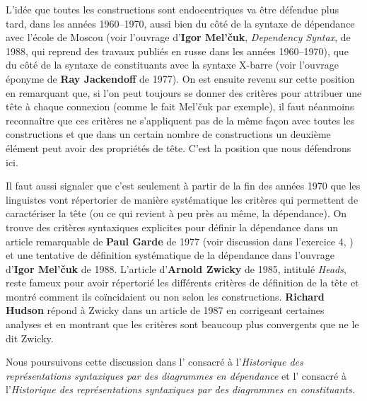 {    L’idée que toutes les constructions sont endocentriques va être défendue plus tard, dans les années 1960--1970, aussi bien du côté de la syntaxe de dépendance avec l’école de Moscou (voir l’ouvrage d’\textbf{Igor Mel’čuk}, \textit{Dependency Syntax}, de 1988, qui reprend des travaux publiés en russe dans les années 1960--1970), que du côté de la syntaxe de constituants avec la syntaxe X-barre (voir l’ouvrage éponyme de \textbf{Ray Jackendoff} de 1977). On est ensuite revenu sur cette position en remarquant que, si l’on peut toujours se donner des critères pour attribuer une tête à chaque connexion (comme le fait Mel’čuk par exemple), il faut néanmoins reconnaître que ces critères ne s’appliquent pas de la même façon avec toutes les constructions et que dans un certain nombre de constructions un deuxième élément peut avoir des propriétés de tête. C’est la position que nous défendrons ici.

    Il faut aussi signaler que c’est seulement à partir de la fin des années 1970 que les linguistes vont répertorier de manière systématique les critères qui permettent de caractériser la tête (ou ce qui revient à peu près au même, la dépendance). On trouve des critères syntaxiques explicites pour définir la dépendance dans un article remarquable de \textbf{Paul Garde} de 1977 (voir discussion dans l’exercice 4, ) et une tentative de définition systématique de la dépendance dans l’ouvrage d’\textbf{Igor Mel’čuk} de 1988. L’article d’\textbf{Arnold Zwicky} de 1985, intitulé \textit{Heads}, reste fameux pour avoir répertorié les différents critères de définition de la tête et montré comment ils coïncidaient ou non selon les constructions. \textbf{Richard Hudson} répond à Zwicky dans un article de 1987 en corrigeant certaines analyses et en montrant que les critères sont beaucoup plus convergents que ne le dit Zwicky.

    Nous poursuivons cette discussion dans l’ consacré à l’\textit{Historique des représentations syntaxiques par des diagrammes en dépendance} et l’ consacré à l’\textit{Historique des représentations syntaxiques par des diagrammes en constituants}.
}
